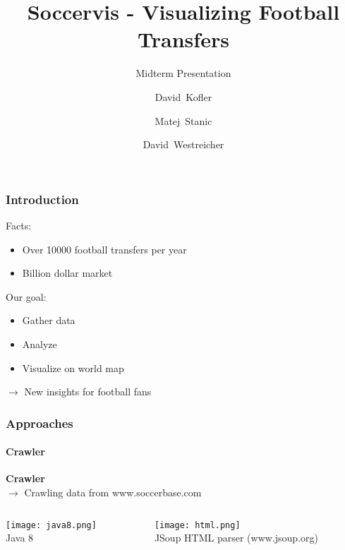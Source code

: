 \documentclass{beamer}
\title[Soccervis] %
{Soccervis - Visualizing Football Transfers}
\subtitle{Midterm Presentation}
\author[Kofler, Stanic, Westreicher] %
{David~Kofler \and Matej~Stanic \and David~Westreicher}
\begin{document}
\frame{\titlepage}


  \begin{frame}
    \frametitle{Introduction}
		Facts:
		\begin{itemize}
			\item Over 10000 football transfers per year
			\item Billion dollar market 
		\end{itemize}
		Our goal: 
		\begin{itemize}
			\item Gather data
			\item Analyze
			\item Visualize on world map
		\end{itemize}
		$\rightarrow$ New insights for football fans
  \end{frame}
	
  \begin{frame}
    \frametitle{Approaches}
		\framesubtitle{Crawler}
		\textbf{Crawler} \\ 
		$\rightarrow$ Crawling data from www.soccerbase.com
		\begin{columns}[T] %
    \begin{column}[T]{5cm} %
			\begin{center}
      \texttt{[image: java8.png]}\\
			Java 8
			\end{center}
    \end{column}
    \begin{column}[T]{5cm} %
		\begin{center}
		 \texttt{[image: html.png]} \\ 
			JSoup HTML parser (www.jsoup.org)
		\end{center}	
    \end{column}
    \end{columns}   
  \end{frame}
	
\end{document}
